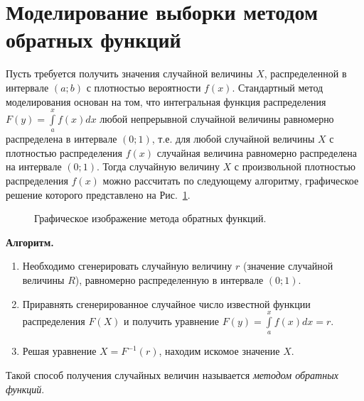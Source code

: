 \documentclass[14pt,a4paper]{scrartcl}
\begin{document}
\section{Моделирование выборки методом обратных функций}
Пусть требуется получить значения случайной величины $X$, распределенной в интервале $(a;b)$ с плотностью вероятности $f(x)$.
Стандартный метод моделирования основан на том, что интегральная функция распределения $F(y) = \int\limits_a^x f(x) dx$ любой непрерывной случайной величины равномерно распределена в интервале $(0;1)$, т.е. для любой случайной величины $X$ с плотностью распределения $f(x)$ случайная величина равномерно распределена на интервале $(0;1)$.
Тогда случайную величину $X$ с произвольной плотностью распределения $f(x)$ можно рассчитать по следующему алгоритму, графическое решение которого представлено на Рис.~\ref{ris:graphical_solution}.
\begin{figure}[h]
	\caption{Графическое изображение метода обратных функций.}
	\label{ris:graphical_solution}
\end{figure}

\textbf{Алгоритм.}
\begin{enumerate}
	\item Необходимо сгенерировать случайную величину $r$ (значение случайной величины $R$), равномерно распределенную в интервале $(0;1)$.
	\item Приравнять сгенерированное случайное число известной функции распределения $F(X)$ и получить уравнение $F(y) = \int\limits_a^x f(x) dx = r$.
	\item Решая уравнение $X = F^{-1}(r)$, находим искомое значение $X$.

\end{enumerate}

Такой способ получения случайных величин называется \textit{методом обратных функций}.
\end{document}
